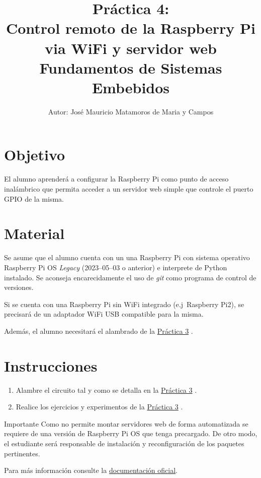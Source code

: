 \documentclass[letterpaper,10.5pt]{article}
\author{\footnotesize Autor: José Mauricio Matamoros de Maria y Campos}
\title{Práctica 4:\\Control remoto de la Raspberry Pi via WiFi y servidor web\\
{\large Fundamentos de Sistemas Embebidos}}
\date{}
\newcommand{\prevpract}{%
	\href{https://github.com/kyordhel/FSEm/tree/master/practica03}{Práctica 3}%
	\xspace{}%
}
\begin{document}
\maketitle

\section{Objetivo}%
\label{sec:objective}
El alumno aprenderá a configurar la Raspberry Pi como punto de acceso inalámbrico que permita acceder a un servidor web simple que controle el puerto GPIO de la misma.%


\section{Material}%
\label{sec:material}
Se asume que el alumno cuenta con un una Raspberry Pi con sistema operativo Raspberry Pi OS \emph{Legacy} (2023--05--03 o anterior) e interprete de Python instalado. Se aconseja encarecidamente el uso de \textit{git} como programa de control de versiones.

Si se cuenta con una Raspberry Pi sin WiFi integrado (e.j~Raspberry Pi2), se precisará de un adaptador WiFi USB compatible para la misma.

Además, el alumno necesitará el alambrado de la \prevpract{}.

\section{Instrucciones}%
\label{sec:instructions}
\begin{enumerate}[noitemsep]
	\item Alambre el circuito tal y como se detalla en la \prevpract{}.
	\item Realice los ejercicios y experimentos de la \prevpract{}.

\end{enumerate}

\begin{greenbox}{Importante}
Como  no permite montar servidores web de forma automatizada se requiere de una versión de Raspberry Pi OS que tenga  precargado.
De otro modo, el estudiante será responsable de instalación y reconfiguración de los paquetes pertinentes.

Para más información consulte la \href{https://wiki.debian.org/NetworkManager}{documentación oficial}.
\end{greenbox}
\end{document}
